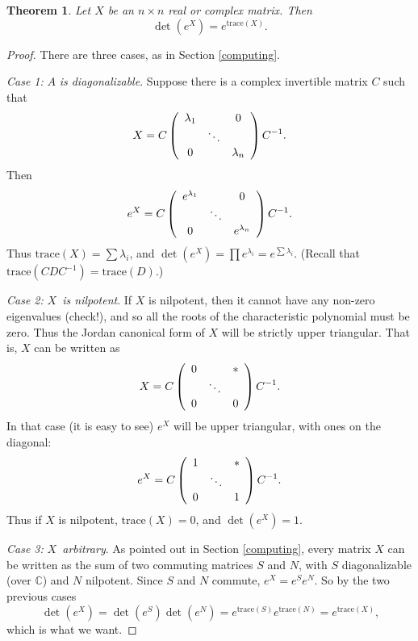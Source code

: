 \documentclass{amsbook}
\theoremstyle{plain}
\newtheorem{theorem}{Theorem}
\numberwithin{equation}{chapter}
\numberwithin{theorem}{chapter}
\begin{document}
\begin{theorem}
\label{exp.trace}Let $X$ be an $n\times n$ real or complex matrix. Then
\[
\det\left(  e^{X}\right)  =e^{\mathrm{trace}(X)}\text{.}%
\]
\end{theorem}

\begin{proof}
There are three cases, as in Section \ref{computing}.

\textit{Case 1: }$A$ \textit{is diagonalizable}. Suppose there is a complex
invertible matrix $C$ such that
\[
X=C\left(
\begin{array}
[c]{ccc}%
\lambda_{1} &  & 0\\
& \ddots & \\
0 &  & \lambda_{n}%
\end{array}
\right)  C^{-1}\text{.}%
\]
Then
\[
e^{X}=C\left(
\begin{array}
[c]{ccc}%
e^{\lambda_{1}} &  & 0\\
& \ddots & \\
0 &  & e^{\lambda_{n}}%
\end{array}
\right)  C^{-1}\text{.}%
\]
Thus $\mathrm{trace}(X)=\sum\lambda_{i}$, and $\det(e^{X})=\prod
e^{\lambda_{i}}=e^{\sum\lambda_{i}}$. (Recall that $\mathrm{trace}%
(CDC^{-1})=\mathrm{trace}(D)$.)

\textit{Case 2: }$X$\textit{\ is nilpotent}. If $X$ is nilpotent, then it
cannot have any non-zero eigenvalues (check!), and so all the roots of the
characteristic polynomial must be zero. Thus the Jordan canonical form of $X$
will be strictly upper triangular. That is, $X$ can be written as
\[
X=C\left(
\begin{array}
[c]{ccc}%
0 &  & \ast\\
& \ddots & \\
0 &  & 0
\end{array}
\right)  C^{-1}\text{.}%
\]
In that case (it is easy to see) $e^{X}$ will be upper triangular, with ones
on the diagonal:
\[
e^{X}=C\left(
\begin{array}
[c]{ccc}%
1 &  & \ast\\
& \ddots & \\
0 &  & 1
\end{array}
\right)  C^{-1}\text{.}%
\]
Thus if $X$ is nilpotent, $\mathrm{trace}(X)=0$, and $\det(e^{X})=1$.

\textit{Case 3: }$X$\textit{\ arbitrary}. As pointed out in Section
\ref{computing}, every matrix $X$ can be written as the sum of two commuting
matrices $S$ and $N$, with $S$ diagonalizable (over $\mathbb{C}$) and $N$
nilpotent. Since $S$ and $N$ commute, $e^{X}=e^{S}e^{N}$. So by the two
previous cases
\[
\det\left(  e^{X}\right)  =\det\left(  e^{S}\right)  \det\left(  e^{N}\right)
=e^{\mathrm{trace}(S)}e^{\mathrm{trace}(N)}=e^{\mathrm{trace}(X)}\text{,}%
\]
which is what we want.
\end{proof}
\end{document}
